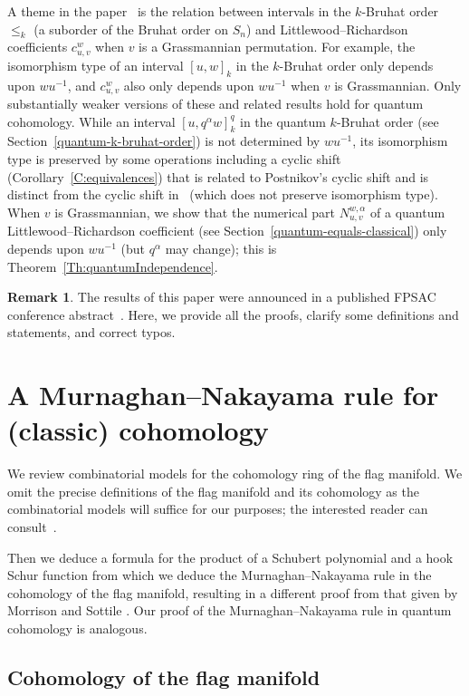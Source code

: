 \documentclass[11pt]{article}
\theoremstyle{definition}
\newtheorem{remark}[theo]{Remark}
\numberwithin{equation}{section}
\begin{document}
A theme in the paper~\cite{BS-Bruhat} is the relation between intervals in the $k$-Bruhat order~$\leq_k$ (a suborder of the Bruhat order on
$S_n$) and Littlewood--Richardson coefficients $c^w_{u,v}$ when $v$ is a Grassmannian permutation.
For example, the isomorphism type of an interval $[u,w]_k$ in the $k$-Bruhat order only depends upon $wu^{-1}$, and $c^w_{u,v}$ also only
depends upon $wu^{-1}$ when $v$ is Grassmannian.
Only substantially weaker versions of these and related results hold for quantum cohomology.
While an interval $[u,q^\alpha w]_k^q$ in the quantum $k$-Bruhat order (see Section~\ref{quantum-k-bruhat-order}) is not determined by
$wu^{-1}$, its isomorphism type is preserved by some operations including a cyclic shift (Corollary~\ref{C:equivalences}) that is related to
Postnikov's cyclic shift and is distinct from the cyclic shift in~\cite{BS-Bruhat} (which does not preserve isomorphism type).
When $v$ is Grassmannian, we show that the numerical part $N^{w,\alpha}_{u,v}$ of a quantum Littlewood--Richardson coefficient (see
Section~\ref{quantum-equals-classical}) only depends upon $wu^{-1}$ (but $q^\alpha$ may change); this is
Theorem~\ref{Th:quantumIndependence}.

\begin{remark}\label{rem:fpsac}
The results of this paper were announced in a published FPSAC conference abstract~\cite{FPSAC23}. Here, we provide all the proofs, clarify some definitions and statements, and correct typos.
\end{remark}

\section{A Murnaghan--Nakayama rule for (classic) cohomology}
\label{sec:classic-mn-rule}

We review combinatorial models for the cohomology ring of the flag manifold.
We omit the precise definitions of the flag manifold and
its cohomology as the combinatorial models will suffice for our purposes; the
interested reader can consult~\cite{Fu97}.

Then we deduce a formula for the product of a Schubert polynomial and a hook
Schur function from which we deduce the Murnaghan--Nakayama rule in the
cohomology of the flag manifold, resulting in a different proof from that given by Morrison and Sottile \cite{MorrisonSottile}.
Our proof of the Murnaghan--Nakayama rule in quantum cohomology is analogous.

\subsection{Cohomology of the flag manifold}
\label{cohomology-ring-of-the-flag-manifold}
\end{document}
